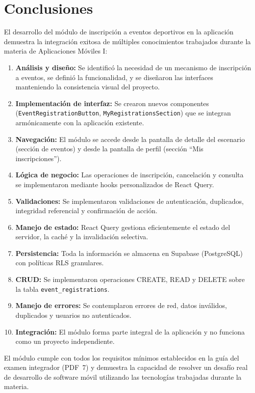 
\section{Conclusiones}

El desarrollo del m\'odulo de inscripci\'on a eventos deportivos en
la aplicaci\'on \nombreApp{} demuestra la integraci\'on exitosa de
m\'ultiples conocimientos trabajados durante la materia de
Aplicaciones M\'oviles I:

\begin{enumerate}
  \item \textbf{An\'alisis y dise\~no:} Se identific\'o la necesidad
    de un mecanismo de inscripci\'on a eventos, se defini\'o la
    funcionalidad, y se dise\~naron las interfaces manteniendo la
    consistencia visual del proyecto.

  \item \textbf{Implementaci\'on de interfaz:} Se crearon nuevos
    componentes (\texttt{EventRegistrationButton},
    \texttt{MyRegistrationsSection}) que se integran
    arm\'onicamente con la aplicaci\'on existente.

  \item \textbf{Navegaci\'on:} El m\'odulo se accede desde la
    pantalla de detalle del escenario (secci\'on de eventos) y
    desde la pantalla de perfil (secci\'on ``Mis inscripciones'').

  \item \textbf{L\'ogica de negocio:} Las operaciones de
    inscripci\'on, cancelaci\'on y consulta se implementaron
    mediante hooks personalizados de React Query.

  \item \textbf{Validaciones:} Se implementaron validaciones de
    autenticaci\'on, duplicados, integridad referencial y
    confirmaci\'on de acci\'on.

  \item \textbf{Manejo de estado:} React Query gestiona
    eficientemente el estado del servidor, la cach\'e y la
    invalidaci\'on selectiva.

  \item \textbf{Persistencia:} Toda la informaci\'on se almacena
    en Supabase (PostgreSQL) con pol\'iticas RLS granulares.

  \item \textbf{CRUD:} Se implementaron operaciones CREATE, READ
    y DELETE sobre la tabla \texttt{event\_registrations}.

  \item \textbf{Manejo de errores:} Se contemplaron errores de
    red, datos inv\'alidos, duplicados y usuarios no
    autenticados.

  \item \textbf{Integraci\'on:} El m\'odulo forma parte
    integral de la aplicaci\'on y no funciona como un proyecto
    independiente.
\end{enumerate}

El m\'odulo cumple con todos los requisitos m\'inimos establecidos
en la gu\'ia del examen integrador (PDF~7) y demuestra la
capacidad de resolver un desaf\'io real de desarrollo de software
m\'ovil utilizando las tecnolog\'ias trabajadas durante la materia.
